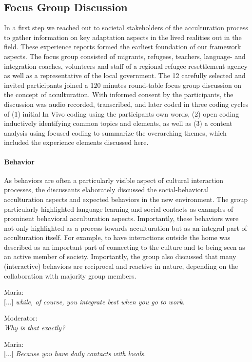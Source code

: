 \documentclass[nobib]{tufte-handout}
\begin{document}
\subsection{Focus Group Discussion}
In a first step we reached out to societal stakeholders of the acculturation process to gather information on key adaptation aspects in the lived realities out in the field. These experience reports formed the earliest foundation of our framework aspects. The focus group consisted of migrants, refugees, teachers, language- and integration coaches, volunteers and staff of a regional refugee resettlement agency as well as a representative of the local government. The 12 carefully selected and invited participants joined a 120 minutes round-table focus group discussion on the concept of acculturation. With informed consent by the participants, the discussion was audio recorded, transcribed, and later coded in three coding cycles of (1) initial In Vivo coding using the participants own words, (2) open coding inductively identifying common topics and elements, as well as (3) a content analysis using focused coding to summarize the overarching themes, which included the experience elements discussed here.

\paragraph{Behavior} As behaviors are often a particularly visible aspect of cultural interaction processes, the discussants elaborately discussed the social-behavioral acculturation aspects and expected behaviors in the new environment. The group particularly highlighted language learning and social contacts as examples of prominent behavioral acculturation aspects. Importantly, these behaviors were not only highlighted as a process towards acculturation but as an integral part of acculturation itself. For example, to have interactions outside the home was described as an important part of connecting to the culture and to being seen as an active member of society. Importantly, the group also discussed that many (interactive) behaviors are reciprocal and reactive in nature, depending on the collaboration with majority group members.
\begin{displayquote}
    Maria:\\
    {[...]} \textit{while, of course, you integrate best when you go to work.}
    
    Moderator:\\
    \textit{Why is that exactly?}
    
    Maria:\\
    {[...]} \textit{Because you have daily contacts with locals.}
\end{displayquote}
\end{document}

